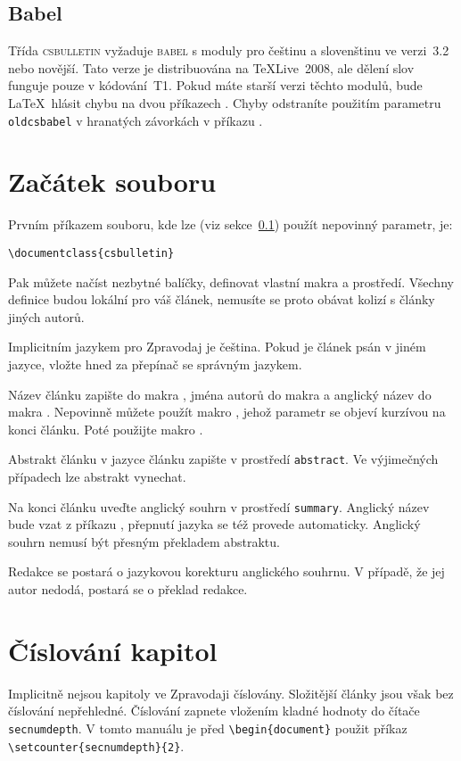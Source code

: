\documentclass{csbulletin}
\let\pkg\textsc
\begin{document}
\subsection{Babel}\label{babel}
Třída \pkg{csbulletin} vyžaduje \pkg{babel} s moduly pro češtinu a slovenštinu ve verzi~3.2 nebo
novější. Tato verze je distribuována na \TeX Live~2008, ale dělení slov funguje pouze v
kódování~T1. Pokud máte starší verzi těchto modulů, bude \LaTeX\ hlásit chybu na dvou příkazech
. Chyby odstraníte použitím parametru \texttt{oldcsbabel} v hranatých
závorkách v příkazu .

\section{Začátek souboru}
Prvním příkazem souboru, kde lze (viz sekce~\ref{babel}) použít nepovinný parametr, je:

\medskip
\verb;\documentclass{csbulletin};
\medskip

Pak můžete načíst nezbytné balíčky, definovat vlastní makra a prostředí. Všechny definice budou
lokální pro váš článek, nemusíte se proto obávat kolizí s články jiných autorů.

Implicitním jazykem pro Zpravodaj je čeština. Pokud je článek psán v jiném jazyce, vložte hned za
 přepínač  se správným jazykem.

Název článku zapište do makra , jména autorů do makra  a anglický název do
makra . Nepovinně můžete použít makro , jehož parametr se objeví
kurzívou na konci článku. Poté použijte makro .

Abstrakt článku v jazyce článku zapište v prostředí \texttt{abstract}. Ve výjimečných případech lze
abstrakt vynechat.

Na konci článku uveďte anglický souhrn v prostředí \texttt{summary}. Anglický název bude vzat z
příkazu , přepnutí jazyka se též provede automaticky. Anglický souhrn nemusí být
přesným překladem abstraktu.

Redakce se postará o jazykovou korekturu anglického souhrnu. V případě, že jej autor nedodá,
postará se o překlad redakce.

\section{Číslování kapitol}
Implicitně nejsou kapitoly ve Zpravodaji číslovány. Složitější články jsou však bez číslování
nepřehledné. Číslování zapnete vložením kladné hodnoty do čítače \texttt{secnumdepth}. V tomto
manuálu je před \verb;\begin{document}; použit příkaz \verb;\setcounter{secnumdepth}{2};.
\end{document}
